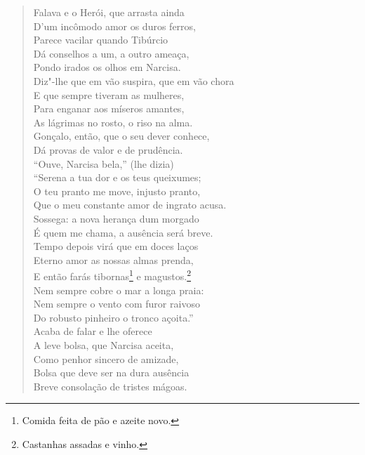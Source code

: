 \begin{verse}
Falava e o Herói, que arrasta ainda\\
D'um incômodo amor os duros ferros,\\
Parece vacilar quando Tibúrcio\\
Dá conselhos a um, a outro ameaça,\\
Pondo irados os olhos em Narcisa.\\
Diz"-lhe que em vão suspira, que em vão chora\\
E que sempre tiveram as mulheres,\\
Para enganar aos míseros amantes,\\
As lágrimas no rosto, o riso na alma.\\
Gonçalo, então, que o seu dever conhece,\\
Dá provas de valor e de prudência.\\
``Ouve, Narcisa bela,'' (lhe dizia)\\
``Serena a tua dor e os teus queixumes;\\
O teu pranto me move, injusto pranto,\\
Que o meu constante amor de ingrato acusa.\\
Sossega: a nova herança dum morgado\\ 		\index{\Morg}
É quem me chama, a ausência será breve.\\
Tempo depois virá que em doces laços\\
Eterno amor as nossas almas prenda,\\
E então farás tibornas\footnote{ Comida feita de pão e azeite novo.}
e magustos.\footnote{ Castanhas assadas e vinho.}\\		\index{\Tiborn}
Nem sempre cobre o mar a longa praia:\\
Nem sempre o vento com furor raivoso\\
Do robusto pinheiro o tronco açoita.'' \\[10pt]


Acaba de falar e lhe oferece\\
A leve bolsa, que Narcisa aceita,\\
Como penhor sincero de amizade,\\
Bolsa que deve ser na dura ausência\\
Breve consolação de tristes mágoas. \\[10pt]



\end{verse}
